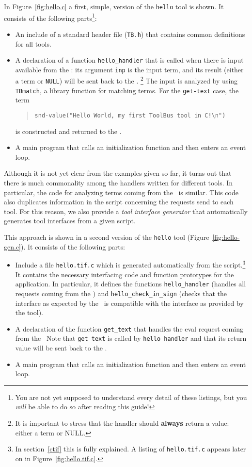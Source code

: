 In Figure~\ref{fig:hello.c} a first, simple, version of the {\tt hello} tool
is shown. It consists of the following parts\footnote{
You are not yet supposed to understand every detail of these
listings, but you {\em will} be able to do so after reading this guide!}:
\begin{itemize}
\item An include of a standard header file ({\tt TB.h}) that contains
common definitions for all tools.
\item A declaration of a function {\tt hello\_handler} that is called when there is
input available from the \TB:
its argument {\tt inp} is the input term, and its result (either a term
or {\tt NULL}) will be sent back to the \TB.
\footnote{It is important to stress that the handler should {\bf always} return a value:
either a term or NULL.}
The input is analyzed by using {\tt TBmatch}, a library function for matching
terms. For the {\tt get-text} case, 
the term
\begin{quote}
\verb+snd-value("Hello World, my first ToolBus tool in C!\n")+
\end{quote}
is constructed and returned to the \TB.

\item A main program that calls an initialization function and
then enters an event loop.

\end{itemize}

Although it is not yet clear from the examples given so far,
it turns out that there is much commonality among the handlers
written for different tools. In particular, the code for analyzing
terms coming from the \TB\ is similar. This code also duplicates
information in the script concerning the requests send to each tool.
For this reason, we also provide a {\em tool interface generator}
that automatically generates tool interfaces from a given script.

This approach is shown in a second version of
the {\tt hello} tool (Figure~\ref{fig:hello-gen.c}).
It consists of the following parts:
\begin{itemize}
\item Include a file {\tt hello.tif.c} which is generated automatically
from the script.\footnote{In section~\ref{ctif} this is fully explained.
A listing of {\tt hello.tif.c} appears later on in Figure~\ref{fig:hello.tif.c}.}
It contains the necessary interfacing code and
function prototypes for the application.
In particular, it defines the functions
{\tt hello\_handler} (handles all requests coming from
the \TB) and {\tt hello\_check\_in\_sign} (checks
that the interface as expected by the \TB\ is compatible with the
interface as provided by the tool).

\item A declaration of the function {\tt get\_text} that handles the
eval request coming from the \TB\ 
Note that {\tt get\_text} is called by {\tt hello\_handler} and that
its return value will be sent back to the \TB.

\item A main program that calls an initialization function and
then enters an event loop.

\end{itemize}


